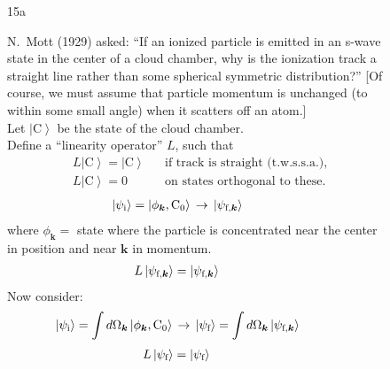 \documentclass[12pt,nofootinbib]{revtex4}
\newcommand{\bs}[1]{\boldsymbol{#1}}
\newcommand{\ket}[1]{\left|#1\right\rangle}
\renewcommand{\i}{\text{i}}
\begin{document}
\begin{figure}[htb] 
\begin{mdframed}
  \vspace{5pt}\hfill 15a\\[3pt] 
  \begin{raggedright}
      N.\ Mott (1929) asked: ``If an ionized particle is emitted in
      an s-wave state in the center of a cloud chamber, why is the
      ionization track a straight line rather than some spherical
      symmetric distribution?''  [Of course, we must assume that
        particle momentum is unchanged (to within some small angle)
        when it scatters off an atom.]\\[5pt]
      Let $\ket{\text{C}}$ be the state of the cloud chamber.\\[5pt]
      Define a ``linearity operator'' $L$, such that   
  \begin{align}\nonumber
    &%
    L\ket{\text{C}}=\ket{\text{C}}
    &&\text{if track is straight (t.w.s.s.a.)},\\[2pt]\nonumber
    &%
    L\ket{\text{C}} = 0 &&\text{on states orthogonal to these.}
  \end{align}
  \vspace{-15pt}
  \begin{align}\nonumber
    &\hspace{-20pt}\ket{\psi_\i}=\ket{\phi_{\bs{k}},\text{C}_0}\,\to\,
    \ket{\psi_{\text{f},\bs{k}}}
  \end{align}
  where $\phi_{\bs{k}} =$ state where the particle is concentrated near
  the center in position and near $\bs{k}$ in momentum.
  \begin{align}\nonumber
    &\hspace{-20pt} L\ket{\psi_{\text{f},\bs{k}}}=\ket{\psi_{\text{f},\bs{k}}}
  \end{align}
  Now consider:
  \begin{align}\nonumber
    &\hspace{-20pt}\ket{\psi_\i}
    =\int d\Omega_{\bs{k}}\ket{\phi_{\bs{k}},\text{C}_0}\,\to\,
    \ket{\psi_{\text{f}}}=\int d\Omega_{\bs{k}}\ket{\psi_{\text{f},\bs{k}}}
  \end{align}
  \vspace{-15pt}
  \begin{align}\nonumber
    &\hspace{-20pt} L\ket{\psi_{\text{f}}}=\ket{\psi_{\text{f}}}
  \end{align}
  \end{raggedright}
\vspace{-.5\baselineskip}
\end{mdframed}
\end{figure}
\end{document}
